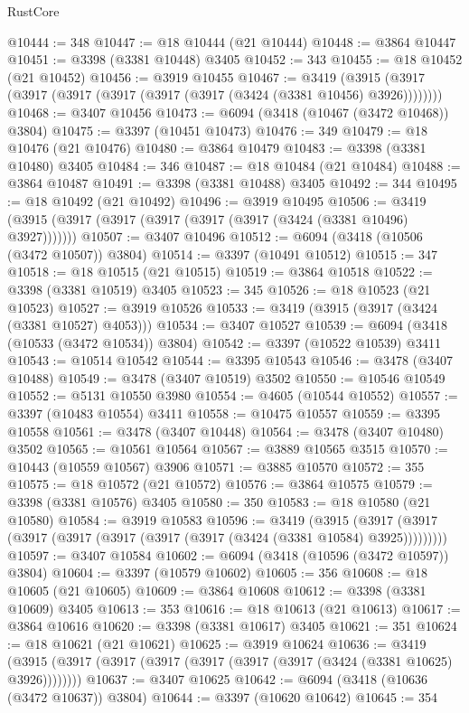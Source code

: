 \begin{lexlean}{RustCore}
\begin{coremodule}
@10444 := 348
@10447 := @18 @10444 (@21 @10444)
@10448 := @3864 @10447
@10451 := @3398 (@3381 @10448) @3405
@10452 := 343
@10455 := @18 @10452 (@21 @10452)
@10456 := @3919 @10455
@10467 := @3419 (@3915 (@3917 (@3917 (@3917 (@3917 (@3917 (@3917 (@3424 (@3381 @10456) @3926))))))))
@10468 := @3407 @10456
@10473 := @6094 (@3418 (@10467 (@3472 @10468)) @3804)
@10475 := @3397 (@10451 @10473)
@10476 := 349
@10479 := @18 @10476 (@21 @10476)
@10480 := @3864 @10479
@10483 := @3398 (@3381 @10480) @3405
@10484 := 346
@10487 := @18 @10484 (@21 @10484)
@10488 := @3864 @10487
@10491 := @3398 (@3381 @10488) @3405
@10492 := 344
@10495 := @18 @10492 (@21 @10492)
@10496 := @3919 @10495
@10506 := @3419 (@3915 (@3917 (@3917 (@3917 (@3917 (@3917 (@3424 (@3381 @10496) @3927)))))))
@10507 := @3407 @10496
@10512 := @6094 (@3418 (@10506 (@3472 @10507)) @3804)
@10514 := @3397 (@10491 @10512)
@10515 := 347
@10518 := @18 @10515 (@21 @10515)
@10519 := @3864 @10518
@10522 := @3398 (@3381 @10519) @3405
@10523 := 345
@10526 := @18 @10523 (@21 @10523)
@10527 := @3919 @10526
@10533 := @3419 (@3915 (@3917 (@3424 (@3381 @10527) @4053)))
@10534 := @3407 @10527
@10539 := @6094 (@3418 (@10533 (@3472 @10534)) @3804)
@10542 := @3397 (@10522 @10539) @3411
@10543 := @10514 @10542
@10544 := @3395 @10543
@10546 := @3478 (@3407 @10488)
@10549 := @3478 (@3407 @10519) @3502
@10550 := @10546 @10549
@10552 := @5131 @10550 @3980
@10554 := @4605 (@10544 @10552)
@10557 := @3397 (@10483 @10554) @3411
@10558 := @10475 @10557
@10559 := @3395 @10558
@10561 := @3478 (@3407 @10448)
@10564 := @3478 (@3407 @10480) @3502
@10565 := @10561 @10564
@10567 := @3889 @10565 @3515
@10570 := @10443 (@10559 @10567) @3906
@10571 := @3885 @10570
@10572 := 355
@10575 := @18 @10572 (@21 @10572)
@10576 := @3864 @10575
@10579 := @3398 (@3381 @10576) @3405
@10580 := 350
@10583 := @18 @10580 (@21 @10580)
@10584 := @3919 @10583
@10596 := @3419
    (@3915 (@3917 (@3917 (@3917 (@3917 (@3917 (@3917 (@3917 (@3424 (@3381 @10584) @3925)))))))))
@10597 := @3407 @10584
@10602 := @6094 (@3418 (@10596 (@3472 @10597)) @3804)
@10604 := @3397 (@10579 @10602)
@10605 := 356
@10608 := @18 @10605 (@21 @10605)
@10609 := @3864 @10608
@10612 := @3398 (@3381 @10609) @3405
@10613 := 353
@10616 := @18 @10613 (@21 @10613)
@10617 := @3864 @10616
@10620 := @3398 (@3381 @10617) @3405
@10621 := 351
@10624 := @18 @10621 (@21 @10621)
@10625 := @3919 @10624
@10636 := @3419 (@3915 (@3917 (@3917 (@3917 (@3917 (@3917 (@3917 (@3424 (@3381 @10625) @3926))))))))
@10637 := @3407 @10625
@10642 := @6094 (@3418 (@10636 (@3472 @10637)) @3804)
@10644 := @3397 (@10620 @10642)
@10645 := 354

\end{coremodule}
\end{lexlean}
